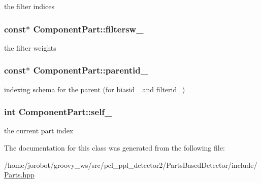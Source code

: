 the filter indices 

\hypertarget{classComponentPart_a301c8633b1e8db3f30436c0ba0fc140d}{
\subsubsection[{filtersw\-\_\-}]{ const$\ast$ {\bf \-Component\-Part\-::filtersw\-\_\-}}}\label{classComponentPart_a301c8633b1e8db3f30436c0ba0fc140d}


the filter weights 

\hypertarget{classComponentPart_a3c75a843f04e4b3d56e4461f8ef803fa}{
\subsubsection[{parentid\-\_\-}]{ const$\ast$ {\bf \-Component\-Part\-::parentid\-\_\-}}}\label{classComponentPart_a3c75a843f04e4b3d56e4461f8ef803fa}


indexing schema for the parent (for biasid\-\_\- and filterid\-\_\-) 

\hypertarget{classComponentPart_a814391cfc1e60223f270d06e3bf2f8b6}{
\subsubsection[{self\-\_\-}]{\setlength{\rightskip}{0pt plus 5cm}int {\bf \-Component\-Part\-::self\-\_\-}}}\label{classComponentPart_a814391cfc1e60223f270d06e3bf2f8b6}


the current part index 



\-The documentation for this class was generated from the following file\-:\begin{DoxyCompactItemize}
\item 
/home/jorobot/groovy\-\_\-ws/src/pcl\-\_\-ppl\-\_\-detector2/\-Parts\-Based\-Detector/include/\hyperlink{Parts_8hpp}{\-Parts.\-hpp}\end{DoxyCompactItemize}
